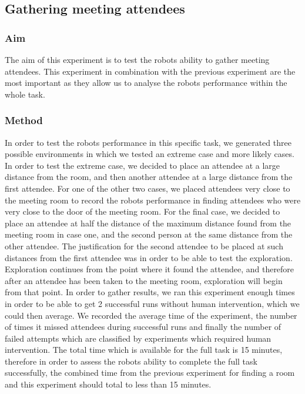 \documentclass[conference]{IEEEtran}
\begin{document}
\subsection{Gathering meeting attendees}
\subsubsection{Aim}
The aim of this experiment is to test the robots ability to gather meeting attendees. This experiment in combination with the previous experiment are the most important as they allow us to analyse the robots performance within the whole task.
\subsubsection{Method}
In order to test the robots performance in this specific task, we generated three possible environments in which we tested an extreme case and more likely cases. In order to test the extreme case, we decided to place an attendee at a large distance from the room, and then another attendee at a large distance from the first attendee. For one of the other two cases, we placed attendees very close to the meeting room to record the robots performance in finding attendees who were very close to the door of the meeting room. For the final case, we decided to place an attendee at half the distance of the maximum distance found from the meeting room in case one, and the second person at the same distance from the other attendee. The justification for the second attendee to be placed at such distances from the first attendee was in order to be able to test the exploration. Exploration continues from the point where it found the attendee, and therefore after an attendee has been taken to the meeting room, exploration will begin from that point. In order to gather results, we ran this experiment enough times in order to be able to get 2 successful runs without human intervention, which we could then average. We recorded the average time of the experiment, the number of times it missed attendees during successful runs and finally the number of failed attempts which are classified by experiments which required human intervention. The total time which is available for the full task is 15 minutes, therefore in order to assess the robots ability to complete the full task successfully, the combined time from the previous experiment for finding a room and this experiment should total to less than 15 minutes.
\end{document}
